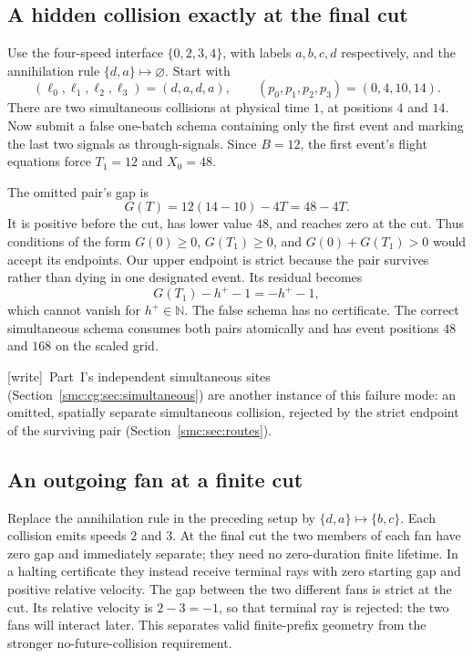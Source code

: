 \documentclass[11pt,letterpaper]{article}
\numberwithin{equation}{section}
\theoremstyle{definition}
\theoremstyle{remark}
\newcommand{\NN}{\mathbb N}
\newcommand{\wtag}{\textup{[write]}}
\begin{document}
\subsection{A hidden collision exactly at the final cut}\label{smc:sd:sec:finalcut}
Use the four-speed interface $\{0,2,3,4\}$, with labels $a,b,c,d$ respectively, and the annihilation rule $\{d,a\}\mapsto\varnothing$. Start with
\[
 (\ell_0,\ell_1,\ell_2,\ell_3)=(d,a,d,a),\qquad
 (p_0,p_1,p_2,p_3)=(0,4,10,14).
\]
There are two simultaneous collisions at physical time $1$, at positions $4$ and $14$. Now submit a false one-batch schema containing only the first event and marking the last two signals as through-signals. Since $B=12$, the first event's flight equations force $T_1=12$ and $X_0=48$.

The omitted pair's gap is
\[
 G(T)=12(14-10)-4T=48-4T.
\]
It is positive before the cut, has lower value $48$, and reaches zero at the cut. Thus conditions of the form $G(0)\ge0$, $G(T_1)\ge0$, and $G(0)+G(T_1)>0$ would accept its endpoints. Our upper endpoint is strict because the pair survives rather than dying in one designated event. Its residual becomes
\[
 G(T_1)-h^+-1=-h^+-1,
\]
which cannot vanish for $h^+\in\NN$. The false schema has no certificate. The correct simultaneous schema consumes both pairs atomically and has event positions $48$ and $168$ on the scaled grid.


\wtag\ Part~I's independent simultaneous sites (Section~\ref{smc:cg:sec:simultaneous}) are another instance of this failure mode: an omitted, spatially separate simultaneous collision, rejected by the strict endpoint of the surviving pair (Section~\ref{smc:sec:routes}).

\subsection{An outgoing fan at a finite cut}
Replace the annihilation rule in the preceding setup by $\{d,a\}\mapsto\{b,c\}$. Each collision emits speeds $2$ and $3$. At the final cut the two members of each fan have zero gap and immediately separate; they need no zero-duration finite lifetime. In a halting certificate they instead receive terminal rays with zero starting gap and positive relative velocity. The gap between the two different fans is strict at the cut. Its relative velocity is $2-3=-1$, so that terminal ray is rejected: the two fans will interact later. This separates valid finite-prefix geometry from the stronger no-future-collision requirement.
\end{document}
